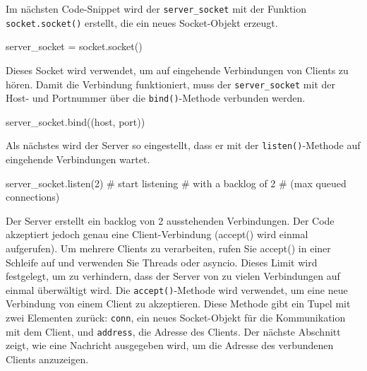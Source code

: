 \documentclass[
  nswissgerman,
  a4paper,
  DIV=11,
  numbers=noendperiod,
  ngerman]{scrreprt}
\newenvironment{Shaded}{\begin{snugshade}}{\end{snugshade}}
\newcommand{\CommentTok}[1]{\textcolor[rgb]{0.37,0.37,0.37}{#1}}
\newcommand{\DecValTok}[1]{\textcolor[rgb]{0.68,0.00,0.00}{#1}}
\newcommand{\NormalTok}[1]{\textcolor[rgb]{0.00,0.23,0.31}{#1}}
\newcommand{\OperatorTok}[1]{\textcolor[rgb]{0.37,0.37,0.37}{#1}}
\begin{document}
Im nächsten Code-Snippet wird der \texttt{server\_socket} mit der
Funktion \texttt{socket.socket()} erstellt, die ein neues Socket-Objekt
erzeugt.

\begin{Shaded}
\begin{Highlighting}[numbers=left,,]
\NormalTok{server\_socket }\OperatorTok{=}\NormalTok{ socket.socket()}
\end{Highlighting}
\end{Shaded}

Dieses Socket wird verwendet, um auf eingehende Verbindungen von Clients
zu hören. Damit die Verbindung funktioniert, muss der
\texttt{server\_socket} mit der Host- und Portnummer über die
\texttt{bind()}-Methode verbunden werden.

\begin{Shaded}
\begin{Highlighting}[numbers=left,,]
\NormalTok{server\_socket.bind((host, port))}
\end{Highlighting}
\end{Shaded}

Als nächstes wird der Server so eingestellt, dass er mit der
\texttt{listen()}-Methode auf eingehende Verbindungen wartet.

\begin{Shaded}
\begin{Highlighting}[numbers=left,,]
\NormalTok{server\_socket.listen(}\DecValTok{2}\NormalTok{) }\CommentTok{\# start listening }
                        \CommentTok{\# with a backlog of 2 }
                        \CommentTok{\# (max queued connections)}
\end{Highlighting}
\end{Shaded}

Der Server erstellt ein backlog von 2 ausstehenden Verbindungen. Der
Code akzeptiert jedoch genau eine Client-Verbindung (accept() wird
einmal aufgerufen). Um mehrere Clients zu verarbeiten, rufen Sie
accept() in einer Schleife auf und verwenden Sie Threads oder asyncio.
Dieses Limit wird festgelegt, um zu verhindern, dass der Server von zu
vielen Verbindungen auf einmal überwältigt wird. Die
\texttt{accept()}-Methode wird verwendet, um eine neue Verbindung von
einem Client zu akzeptieren. Diese Methode gibt ein Tupel mit zwei
Elementen zurück: \texttt{conn}, ein neues Socket-Objekt für die
Kommunikation mit dem Client, und \texttt{address}, die Adresse des
Clients. Der nächste Abschnitt zeigt, wie eine Nachricht ausgegeben
wird, um die Adresse des verbundenen Clients anzuzeigen.
\end{document}
